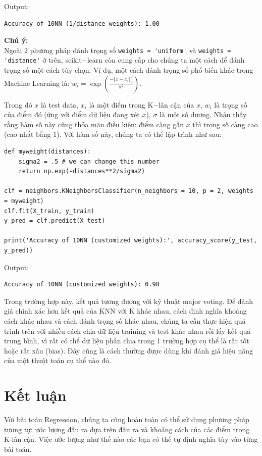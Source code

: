 \documentclass{article}
\begin{document}
Output:

\begin{lstlisting}
Accuracy of 10NN (1/distance weights): 1.00
\end{lstlisting}

\textbf{Chú ý:}
\\

Ngoài 2 phương pháp đánh trọng số \lstinline{weights = 'uniform'} và \lstinline{weights = 'distance'} ở trên, scikit$-$learn còn cung cấp cho chúng ta một cách để đánh trọng số một cách tùy chọn. Ví dụ, một cách đánh trọng số phổ biến khác trong Machine Learning là: $w_i = \exp(\frac{-\Vert x - x_i \Vert_2^2}{\sigma^2})$.

Trong đó $x$ là test data, $x_i$ là một điểm trong K$-$lân cận của $x$, $w_i$ là trọng số của điểm đó (ứng với điểm dữ liệu đang xét $x$), $\sigma$ là một số dương. Nhận thấy rằng hàm số này cũng thỏa mãn điều kiện: điểm càng gần $x$ thì trọng số càng cao (cao nhất bằng 1). Với hàm số này, chúng ta có thể lập trình như sau:

\begin{lstlisting}
def myweight(distances):
    sigma2 = .5 # we can change this number
    return np.exp(-distances**2/sigma2)

clf = neighbors.KNeighborsClassifier(n_neighbors = 10, p = 2, weights = myweight)
clf.fit(X_train, y_train)
y_pred = clf.predict(X_test)

print('Accuracy of 10NN (customized weights):', accuracy_score(y_test, y_pred))
\end{lstlisting}

Output:

\begin{lstlisting}
Accuracy of 10NN (customized weights): 0.98
\end{lstlisting}

Trong trường hợp này, kết quả tương đương với kỹ thuật major voting. Để đánh giá chính xác hơn kết quả của KNN với K khác nhau, cách định nghĩa khoảng cách khác nhau và cách đánh trọng số khác nhau, chúng ta cần thực hiện quá trình trên với nhiều cách chia dữ liệu training và test khác nhau rồi lấy kết quả trung bình, vì rất có thể dữ liệu phân chia trong 1 trường hợp cụ thể là rất tốt hoặc rất xấu (bias). Đây cũng là cách thường được dùng khi đánh giá hiệu năng của một thuật toán cụ thể nào đó.

\section{Kết luận}
Với bài toán Regression, chúng ta cũng hoàn toàn có thể sử dụng phương pháp tương tự: ước lượng đầu ra dựa trên đầu ra và khoảng cách của các điểm trong K-lân cận. Việc ước lượng như thế nào các bạn có thể tự định nghĩa tùy vào từng bài toán.
\end{document}
